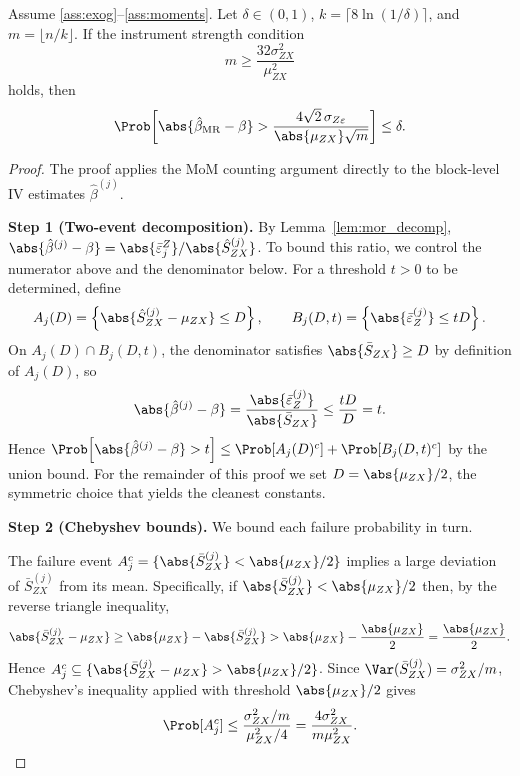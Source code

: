 \begin{theorem}
\label{thm:mor}
Assume \ref{ass:exog}--\ref{ass:moments}. Let $\delta \in (0,1)$, $k = \lceil 8\ln(1/\delta) \rceil$, and $m = \lfloor n/k \rfloor$. If the instrument strength condition
\begin{equation}
\label{eq:mor_strength}
    m \geq \frac{32\sigma_{ZX}^2}{\mu_{ZX}^2}
\end{equation}
holds, then
\begin{equation}
\label{eq:mor_bound}
    \Prob\!\left[\abs{\hat{\beta}_{\mathrm{MR}} - \beta} > \frac{4\sqrt{2}\,\sigma_{Z\varepsilon}}{\abs{\mu_{ZX}}\sqrt{m}}\right] \leq \delta.
\end{equation}
\end{theorem}

\begin{proof}
The proof applies the MoM counting argument directly to the block-level IV estimates $\hat{\beta}^{(j)}$.

\medskip\noindent\textbf{Step 1 (Two-event decomposition).} By Lemma~\ref{lem:mor_decomp}, $\abs{\hat{\beta}^{(j)} - \beta} = \abs{\bar{\varepsilon}_j^Z}/\abs{\hat{S}_{ZX}^{(j)}}$. To bound this ratio, we control the numerator above and the denominator below. For a threshold $t > 0$ to be determined, define
\[
    A_j(D) = \left\{\abs{\hat{S}_{ZX}^{(j)} - \mu_{ZX}} \leq D\right\}, \qquad B_j(D,t) = \left\{\abs{\bar{\varepsilon}_Z^{(j)}} \leq tD\right\}.
\]
On $A_j(D)\cap B_j(D,t)$, the denominator satisfies $\abs{\bar{S}_{ZX}}\geq D$ by definition of $A_j(D)$, so
\[
    \abs{\hat{\beta}^{(j)} - \beta} = \frac{\abs{\bar{\varepsilon}_Z^{(j)}}}{\abs{\bar{S}_{ZX}}} \leq \frac{tD}{D} = t.
\]
Hence $\Prob\!\left[\abs{\hat\beta^{(j)}-\beta}>t\right] \leq \Prob[A_j(D)^c] + \Prob[B_j(D,t)^c]$ by the union bound. For the remainder of this proof we set $D = \abs{\mu_{ZX}}/2$, the symmetric choice that yields the cleanest constants.

    \medskip\noindent\textbf{Step 2 (Chebyshev bounds).}
    We bound each failure probability in turn.

    The failure event $A_j^c = \{\abs{\bar{S}_{ZX}^{(j)}} < \abs{\mu_{ZX}}/2\}$ implies a large deviation of $\bar{S}_{ZX}^{(j)}$ from its mean. Specifically, if $\abs{\bar{S}_{ZX}^{(j)}} < \abs{\mu_{ZX}}/2$ then, by the reverse triangle inequality,
    \[
        \abs{\bar{S}_{ZX}^{(j)} - \mu_{ZX}} \geq \abs{\mu_{ZX}} - \abs{\bar{S}_{ZX}^{(j)}} > \abs{\mu_{ZX}} - \frac{\abs{\mu_{ZX}}}{2} = \frac{\abs{\mu_{ZX}}}{2}.
    \]
    Hence $A_j^c \subseteq \{\abs{\bar{S}_{ZX}^{(j)}-\mu_{ZX}} > \abs{\mu_{ZX}}/2\}$. Since $\Var(\bar{S}_{ZX}^{(j)}) = \sigma_{ZX}^2/m$, Chebyshev's inequality applied with threshold $\abs{\mu_{ZX}}/2$ gives
    \[
        \Prob[A_j^c] \leq \frac{\sigma_{ZX}^2/m}{\mu_{ZX}^2/4} = \frac{4\sigma_{ZX}^2}{m\mu_{ZX}^2}.
    \]


\end{proof}
